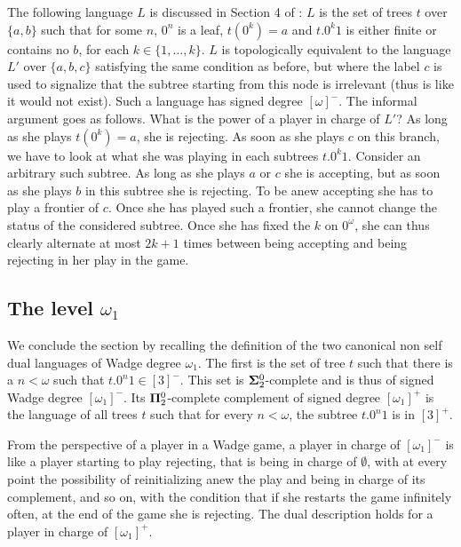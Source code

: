 \begin{remark}\label{rem:example}
The following language $L$ is discussed in Section 4 of  \cite{bp}: $L$ is the set of trees $t$ over $\{a,b\}$ such that for some $n$, $0^n$ is a leaf, $t(0^k)=a$ and $t.0^k1$ is either finite or contains no $b$, for each $k\in \{1, \dots, k\}$. $L$ is topologically equivalent to the language  $L'$ over $\{a, b, c\}$ satisfying the same condition as before, but where the label $c$ is used to signalize that the subtree starting from this node is irrelevant (thus is like it would not exist). Such a language has signed degree $[\omega]^-$. The informal argument goes as follows. What is the power of a player in charge of $L'$? As long as she plays $t(0^k)=a$, she is rejecting. 
As soon as she plays $c$ on this branch, we have to look at what she was playing in each subtrees  $t.0^k1$. Consider an arbitrary such subtree. As long as she plays $a$ or $c$ she is accepting, but as soon as she plays $b$ in this subtree she is rejecting. To be anew accepting she has to play a frontier of $c$. Once she has played such a frontier, she cannot change the status of the considered subtree. Once she has fixed the $k$ on $0^\omega$, she can thus clearly alternate at most $2k+1$ times between being accepting and being rejecting in her play in the  game. 
\end{remark}

\subsection{The level $\omega_1$}
We conclude the section by recalling the definition of the two canonical non self dual languages of Wadge degree $\omega_1$. The first is the set of tree $t$ such that there is a $n<\omega$ such that $t.0^n1 \in [3]^-$. This set is ${\bf \Sigma}^0_2$-complete and is thus of signed Wadge degree $[\omega_1]^-$. Its ${\bf \Pi}^0_2$-complete complement of signed degree $[\omega_1]^+$ is the language of all trees $t$ such that for every $n<\omega$, the subtree $t.0^n1$ is in  $[3]^+$.

From the perspective of a player in a Wadge game, a player in charge of $[\omega_1]^-$ is like a player starting to play rejecting, that is being in charge of $\emptyset$, with at every point the possibility of reinitializing anew the play and being in charge of its complement, and so on, with the condition that if she restarts the game infinitely often, at the end of the game she is rejecting. 
The dual description holds for a player in charge of $[\omega_1]^+$.


